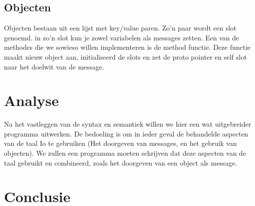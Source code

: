 \documentclass[12pt]{article}
\begin{document}
\subsection{Objecten}
Objecten bestaan uit een lijst met key/value paren. Zo'n paar wordt een slot genoemd.
in zo'n slot kun je zowel variabelen als messages zetten.
Een van de methodes die we sowieso willen implementeren is de method functie. 
Deze functie maakt nieuw object aan, initialiseerd de slots en zet de proto pointer en self slot naar het doelwit van de message. 

\section{Analyse}
Na het vastleggen van de syntax en semantiek willen we hier een wat uitgebreider programma uitwerken. De bedoeling is om in ieder geval de behandelde aspecten van de taal Io te gebruiken (Het doorgeven van messages, en het gebruik van objecten). We zullen een programma moeten schrijven dat deze aspecten van de taal gebruikt en combineerd, zoals het doorgeven van een object als message.

\section{Conclusie}

\appendix
\end{document}
